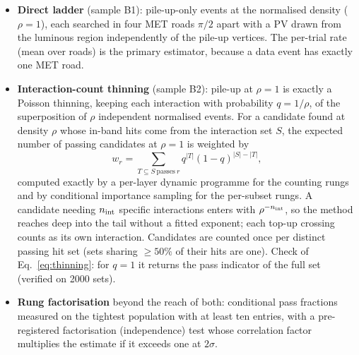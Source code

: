\begin{itemize}
\item \textbf{Direct ladder} (sample B1): pile-up-only events at the normalised density ($\rho=1$), each searched in four MET
  roads $\pi/2$ apart with a PV drawn from the luminous region independently of the pile-up vertices. The per-trial rate
  (mean over roads) is the primary estimator, because a data event has exactly one MET road.
\item \textbf{Interaction-count thinning} (sample B2): pile-up at $\rho=1$ is exactly a Poisson thinning, keeping each
  interaction with probability $q=1/\rho$, of the superposition of $\rho$ independent normalised events. For a candidate
  found at density $\rho$ whose in-band hits come from the interaction set $S$, the expected number of passing candidates
  at $\rho=1$ is weighted by
  \begin{equation}
    w_r=\sum_{T\subseteq S\ \text{passes}\ r} q^{|T|}(1-q)^{|S|-|T|},
    \label{eq:thinning}
  \end{equation}
  computed exactly by a per-layer dynamic programme for the counting rungs and by conditional importance sampling for
  the per-subset rungs. A candidate needing $n_{\rm int}$ specific interactions enters with $\rho^{-n_{\rm int}}$, so the
  method reaches deep into the tail without a fitted exponent; each top-up crossing counts as its own interaction.
  Candidates are counted once per distinct passing hit set (sets sharing $\ge50\%$ of their hits are one).
  Check of Eq.~\eqref{eq:thinning}: for $q=1$ it returns the pass indicator of the full set (verified on 2000 sets).
\item \textbf{Rung factorisation} beyond the reach of both: conditional pass fractions measured on the tightest population
  with at least ten entries, with a pre-registered factorisation (independence) test whose correlation factor
  multiplies the estimate if it exceeds one at $2\sigma$.
\end{itemize}


